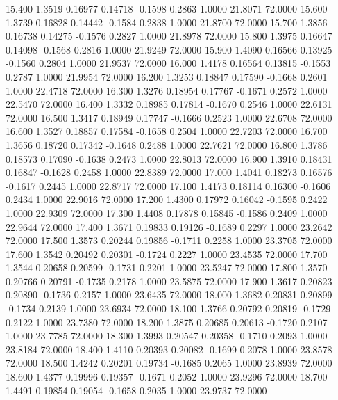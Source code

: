   15.400   1.3519   0.16977   0.14718  -0.1598   0.2863   1.0000  21.8071  72.0000
  15.600   1.3739   0.16828   0.14442  -0.1584   0.2838   1.0000  21.8700  72.0000
  15.700   1.3856   0.16738   0.14275  -0.1576   0.2827   1.0000  21.8978  72.0000
  15.800   1.3975   0.16647   0.14098  -0.1568   0.2816   1.0000  21.9249  72.0000
  15.900   1.4090   0.16566   0.13925  -0.1560   0.2804   1.0000  21.9537  72.0000
  16.000   1.4178   0.16564   0.13815  -0.1553   0.2787   1.0000  21.9954  72.0000
  16.200   1.3253   0.18847   0.17590  -0.1668   0.2601   1.0000  22.4718  72.0000
  16.300   1.3276   0.18954   0.17767  -0.1671   0.2572   1.0000  22.5470  72.0000
  16.400   1.3332   0.18985   0.17814  -0.1670   0.2546   1.0000  22.6131  72.0000
  16.500   1.3417   0.18949   0.17747  -0.1666   0.2523   1.0000  22.6708  72.0000
  16.600   1.3527   0.18857   0.17584  -0.1658   0.2504   1.0000  22.7203  72.0000
  16.700   1.3656   0.18720   0.17342  -0.1648   0.2488   1.0000  22.7621  72.0000
  16.800   1.3786   0.18573   0.17090  -0.1638   0.2473   1.0000  22.8013  72.0000
  16.900   1.3910   0.18431   0.16847  -0.1628   0.2458   1.0000  22.8389  72.0000
  17.000   1.4041   0.18273   0.16576  -0.1617   0.2445   1.0000  22.8717  72.0000
  17.100   1.4173   0.18114   0.16300  -0.1606   0.2434   1.0000  22.9016  72.0000
  17.200   1.4300   0.17972   0.16042  -0.1595   0.2422   1.0000  22.9309  72.0000
  17.300   1.4408   0.17878   0.15845  -0.1586   0.2409   1.0000  22.9644  72.0000
  17.400   1.3671   0.19833   0.19126  -0.1689   0.2297   1.0000  23.2642  72.0000
  17.500   1.3573   0.20244   0.19856  -0.1711   0.2258   1.0000  23.3705  72.0000
  17.600   1.3542   0.20492   0.20301  -0.1724   0.2227   1.0000  23.4535  72.0000
  17.700   1.3544   0.20658   0.20599  -0.1731   0.2201   1.0000  23.5247  72.0000
  17.800   1.3570   0.20766   0.20791  -0.1735   0.2178   1.0000  23.5875  72.0000
  17.900   1.3617   0.20823   0.20890  -0.1736   0.2157   1.0000  23.6435  72.0000
  18.000   1.3682   0.20831   0.20899  -0.1734   0.2139   1.0000  23.6934  72.0000
  18.100   1.3766   0.20792   0.20819  -0.1729   0.2122   1.0000  23.7380  72.0000
  18.200   1.3875   0.20685   0.20613  -0.1720   0.2107   1.0000  23.7785  72.0000
  18.300   1.3993   0.20547   0.20358  -0.1710   0.2093   1.0000  23.8184  72.0000
  18.400   1.4110   0.20393   0.20082  -0.1699   0.2078   1.0000  23.8578  72.0000
  18.500   1.4242   0.20201   0.19734  -0.1685   0.2065   1.0000  23.8939  72.0000
  18.600   1.4377   0.19996   0.19357  -0.1671   0.2052   1.0000  23.9296  72.0000
  18.700   1.4491   0.19854   0.19054  -0.1658   0.2035   1.0000  23.9737  72.0000
